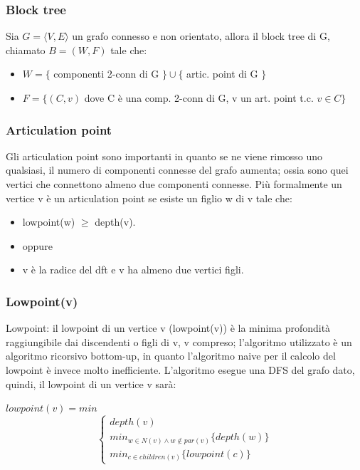 \documentclass[12pt,a4paper]{article}
\begin{document}
\subsubsection{Block tree}
Sia $G = \langle V, E \rangle$ un grafo connesso e non orientato, allora il block tree di G, chiamato $B = (W, F)$ tale che:
\begin{itemize}
\item $W = \lbrace$ componenti 2-conn di G $\rbrace \cup \lbrace$ artic. point di G $\rbrace$
\item $F = \lbrace (C, v)$ dove C è una comp. 2-conn di G, v un art. point t.c. $v \in C\rbrace$
\end{itemize}

\subsubsection{Articulation point}
Gli articulation point sono importanti in quanto se ne viene rimosso uno qualsiasi, il numero di componenti connesse del grafo aumenta; ossia sono quei vertici che connettono almeno due componenti connesse. Più formalmente un vertice v è un articulation point se esiste un figlio w di v tale che:
\begin{itemize}
\item lowpoint(w) $\geqslant$ depth(v).
\item oppure
\item v è la radice del dft e v ha almeno due vertici figli.
\end{itemize}

\subsubsection{Lowpoint(v)}
Lowpoint: il lowpoint di un vertice v (lowpoint(v)) è la minima profondità raggiungibile dai discendenti o figli di v, v compreso; l'algoritmo utilizzato è un algoritmo ricorsivo bottom-up, in quanto l'algoritmo naive per il calcolo del lowpoint è invece molto inefficiente. L'algoritmo esegue una DFS del grafo dato, quindi, il lowpoint di un vertice v sarà:

$lowpoint(v) = min$
\begin{equation}
    \begin{cases}
      depth(v)\\
      min_{w \in N(v) \wedge w \notin par(v)} \lbrace depth(w) \rbrace\\
      min_{c \in children(v)} \lbrace lowpoint(c) \rbrace
    \end{cases}
\end{equation}
\end{document}

